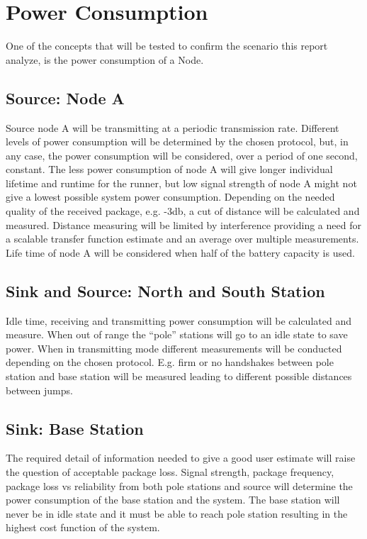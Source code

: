 \section{Power Consumption}\label{introduction:powerConsumption}

One of the concepts that will be tested to confirm the scenario this report analyze, is the power consumption of a Node.

\subsection{Source: Node A}
Source node A will be transmitting at a periodic transmission rate. Different levels of power consumption will be determined by the chosen protocol, but, in any case, the power consumption will be considered, over a period of one second, constant. The less power consumption of node A will give longer individual lifetime and runtime for the runner, but low signal strength of node A might not give a lowest possible system power consumption. Depending on the needed quality of the received package, e.g. -3db, a cut of distance will be calculated and measured. Distance measuring will be limited by interference providing a need for a scalable transfer function estimate and an average over multiple measurements. Life time of node A will be considered when half of the battery capacity is used.

\subsection{Sink and Source: North and South Station}
Idle time, receiving and transmitting power consumption will be calculated and measure. When out of range the “pole” stations will go to an idle state to save power. When in transmitting mode different measurements will be conducted depending on the chosen protocol. E.g. firm or no handshakes between pole station and base station will be measured leading to different possible distances between jumps.

\subsection{Sink: Base Station}
The required detail of information needed to give a good user estimate will raise the question of acceptable package loss. Signal strength, package frequency, package loss vs reliability from both pole stations and source will determine the power consumption of the base station and the system. The base station will never be in idle state and it must be able to reach pole station resulting in the highest cost function of the system. 

